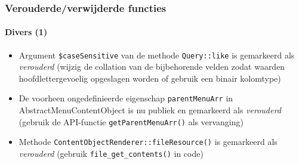 \begin{frame}[fragile]
	\frametitle{Verouderde/verwijderde functies}
	\framesubtitle{Divers (1)}


	\begin{itemize}

		\item Argument \texttt{\$caseSensitive} van de methode \texttt{Query::like}
			is gemarkeerd als \textit{verouderd}\newline
			\smaller
				(wijzig de collation van de bijbehorende velden zodat waarden hoofdlettergevoelig opgeslagen worden
				of gebruik een binair kolomtype)
			\normalsize

		\item De voorheen ongedefinieerde eigenschap \texttt{parentMenuArr} in AbstractMenuContentObject
			is nu publiek en gemarkeerd als \textit{verouderd}\newline
			\smaller
				(gebruik de API-functie \texttt{getParentMenuArr()} als vervanging)
			\normalsize

		\item Methode \texttt{ContentObjectRenderer::fileResource()}
			is gemarkeerd als \textit{verouderd}\newline
			\smaller
				(gebruik \texttt{file\_get\_contents()} in code)
			\normalsize

	\end{itemize}

\end{frame}





